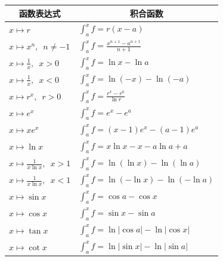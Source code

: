 \documentclass[12pt,UTF8]{ctexbook}
\theoremstyle{definition}
\theoremstyle{plain}
\begin{document}
\begin{appendix}
\begin{center}
    \renewcommand{\arraystretch}{2}
    \setlength{\extrarowheight}{-3pt}
    \begin{longtable}{|l|l|}
        \hline \multicolumn{1}{|c|}{\textbf{函数表达式}} & \multicolumn{1}{c|}{\textbf{积合函数}} \\[4pt] 
        \hline    
        $\displaystyle x\mapsto r$ & $\displaystyle \int_a^x f = r(x - a)$ \\[4pt]
        \hline    
        $\displaystyle x\mapsto x^n,\,\,\,n\neq -1$ & $\displaystyle \int_a^x f = \frac{x^{n+1} - a^{n+1}}{n+1}$ \\[4pt]
        \hline    
        $\displaystyle x\mapsto \frac{1}{x}, \,\,\, x > 0$ & $\displaystyle \int_a^x f = \ln{x} - \ln{a}$ \\[4pt]
        \hline    
        $\displaystyle x\mapsto \frac{1}{x}, \,\,\, x < 0$ & $\displaystyle \int_a^x f = \ln{(-x)} - \ln{(-a)}$ \\[4pt]
        \hline
        $\displaystyle x\mapsto r^x,\,\,\, r>0$ & $\displaystyle \int_a^x f = \frac{r^x - r^a}{\ln{r}}$ \\[4pt]
        \hline
        $\displaystyle x\mapsto e^x$ & $\displaystyle \int_a^x f = e^x - e^a$ \\[4pt]
        \hline    
        $\displaystyle x\mapsto xe^x$ & $\displaystyle \int_a^x f = (x - 1)e^x - (a - 1)e^a$ \\[4pt]
        \hline
        $\displaystyle x\mapsto \ln{x}$ & $\displaystyle \int_a^x f = x\ln{x} - x - a\ln{a} + a$ \\[4pt]
        \hline
        $\displaystyle x\mapsto \frac{1}{x\ln{x}},\,\,\, x>1$ & $\displaystyle \int_a^x f = \ln{(\ln{x})} - \ln{(\ln{a})}$ \\[4pt]
        \hline
        $\displaystyle x\mapsto \frac{1}{x\ln{x}},\,\,\, x<1$ & $\displaystyle \int_a^x f = \ln{(-\ln{x})} - \ln{(-\ln{a})}$ \\[4pt]
        \hline    
        $\displaystyle x\mapsto \sin{x}$ & $\displaystyle \int_a^x f = \cos{a} - \cos{x}$ \\[4pt]
        \hline    
        $\displaystyle x\mapsto \cos{x}$ & $\displaystyle \int_a^x f = \sin{x} - \sin{a}$ \\[4pt]
        \hline    
        $\displaystyle x\mapsto \tan{x}$ & $\displaystyle \int_a^x f = \ln{|\cos{a}|} - \ln{|\cos{x}|}$ \\[4pt]
        \hline    
        $\displaystyle x\mapsto \cot{x}$ & $\displaystyle \int_a^x f = \ln{|\sin{x}|} - \ln{|\sin{a}|}$ \\[4pt]

\end{longtable}
\end{center}
\end{appendix}
\end{document}

